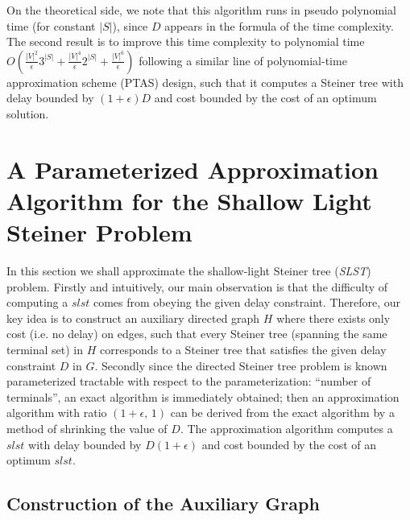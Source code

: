 \documentclass[english,runningheads,a4paper]{llncs}
\begin{document}
On the theoretical side, we note that this algorithm runs in pseudo
polynomial time (for constant $|S|$), since $D$ appears in the formula
of the time complexity. The second result is to improve this time
complexity to polynomial time $O(\frac{|V|^{2}}{\epsilon}3^{|S|}+\frac{|V|^{4}}{\epsilon}2^{|S|}+\frac{|V|^{6}}{\epsilon})$
following a similar line of polynomial-time approximation scheme (PTAS)
design, such that it computes a Steiner tree with delay bounded by
$(1+\epsilon)D$ and cost bounded by the cost of an optimum solution.


\section{A Parameterized Approximation Algorithm for the Shallow Light Steiner
Problem}

In this section we shall approximate the shallow-light Steiner tree
(\emph{SLST}) problem. Firstly and intuitively, our main observation
is that the difficulty of computing a \emph{$slst$} comes from obeying
the given delay constraint. Therefore, our key idea is to construct
an auxiliary directed graph $H$ where there exists only cost (i.e.
no delay) on edges, such that every Steiner tree (spanning the same
terminal set) in $H$ corresponds to a Steiner tree that satisfies
the given delay constraint $D$ in $G$. Secondly since the directed
Steiner tree problem is known parameterized tractable with respect
to the parameterization: ``number of terminals''\cite{guo2011parameterized,ding2007finding},
an exact algorithm is immediately obtained; then an approximation
algorithm with ratio $(1+\epsilon,\,1)$ can be derived from the exact
algorithm by a method of shrinking the value of $D$. The approximation
algorithm computes a $slst$ with delay bounded by $D(1+\epsilon)$
and cost bounded by the cost of an optimum $slst$.


\subsection{Construction of the Auxiliary Graph}
\end{document}
